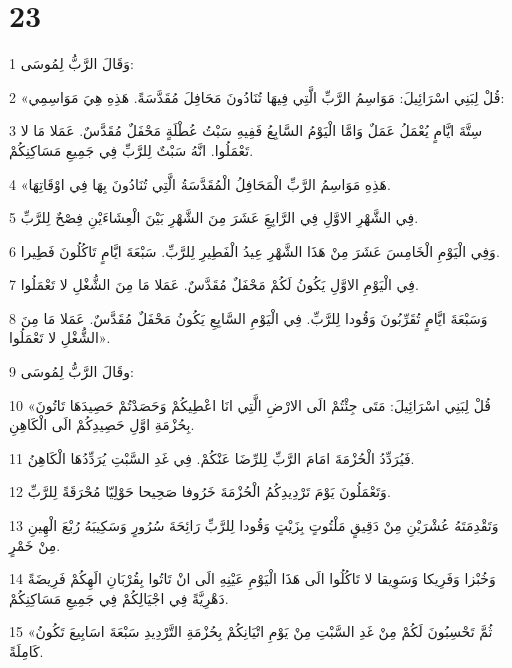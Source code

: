 \chapter{23}

\par 1 وَقَالَ الرَّبُّ لِمُوسَى:
\par 2 «قُلْ لِبَنِي اسْرَائِيلَ: مَوَاسِمُ الرَّبِّ الَّتِي فِيهَا تُنَادُونَ مَحَافِلَ مُقَدَّسَةً. هَذِهِ هِيَ مَوَاسِمِي:
\par 3 سِتَّةَ ايَّامٍ يُعْمَلُ عَمَلٌ وَامَّا الْيَوْمُ السَّابِعُ فَفِيهِ سَبْتُ عُطْلَةٍ مَحْفَلٌ مُقَدَّسٌ. عَمَلا مَا لا تَعْمَلُوا. انَّهُ سَبْتٌ لِلرَّبِّ فِي جَمِيعِ مَسَاكِنِكُمْ.
\par 4 «هَذِهِ مَوَاسِمُ الرَّبِّ الْمَحَافِلُ الْمُقَدَّسَةُ الَّتِي تُنَادُونَ بِهَا فِي اوْقَاتِهَا.
\par 5 فِي الشَّهْرِ الاوَّلِ فِي الرَّابِعَِ عَشَرَ مِنَ الشَّهْرِ بَيْنَ الْعِشَاءَيْنِ فِصْحٌ لِلرَّبِّ.
\par 6 وَفِي الْيَوْمِ الْخَامِسَ عَشَرَ مِنْ هَذَا الشَّهْرِ عِيدُ الْفَطِيرِ لِلرَّبِّ. سَبْعَةَ ايَّامٍ تَاكُلُونَ فَطِيرا.
\par 7 فِي الْيَوْمِ الاوَّلِ يَكُونُ لَكُمْ مَحْفَلٌ مُقَدَّسٌ. عَمَلا مَا مِنَ الشُّغْلِ لا تَعْمَلُوا.
\par 8 وَسَبْعَةَ ايَّامٍ تُقَرِّبُونَ وَقُودا لِلرَّبِّ. فِي الْيَوْمِ السَّابِعِ يَكُونُ مَحْفَلٌ مُقَدَّسٌ. عَمَلا مَا مِنَ الشُّغْلِ لا تَعْمَلُوا».
\par 9 وقَالَ الرَّبُّ لِمُوسَى:
\par 10 «قُلْ لِبَنِي اسْرَائِيلَ: مَتَى جِئْتُمْ الَى الارْضِ الَّتِي انَا اعْطِيكُمْ وَحَصَدْتُمْ حَصِيدَهَا تَاتُونَ بِحُزْمَةِ اوَّلِ حَصِيدِكُمْ الَى الْكَاهِنِ.
\par 11 فَيُرَدِّدُ الْحُزْمَةَ امَامَ الرَّبِّ لِلرِّضَا عَنْكُمْ. فِي غَدِ السَّبْتِ يُرَدِّدُهَا الْكَاهِنُ.
\par 12 وَتَعْمَلُونَ يَوْمَ تَرْدِيدِكُمُ الْحُزْمَةَ خَرُوفا صَحِيحا حَوْلِيّا مُحْرَقَةً لِلرَّبِّ.
\par 13 وَتَقْدِمَتَهُ عُشْرَيْنِ مِنْ دَقِيقٍ مَلْتُوتٍ بِزَيْتٍ وَقُودا لِلرَّبِّ رَائِحَةَ سُرُورٍ وَسَكِيبَهُ رُبْعَ الْهِينِ مِنْ خَمْرٍ.
\par 14 وَخُبْزا وَفَرِيكا وَسَوِيقا لا تَاكُلُوا الَى هَذَا الْيَوْمِ عَيْنِهِ الَى انْ تَاتُوا بِقُرْبَانِ الَهِكُمْ فَرِيضَةً دَهْرِيَّةً فِي اجْيَالِكُمْ فِي جَمِيعِ مَسَاكِنِكُمْ.
\par 15 «ثُمَّ تَحْسِبُونَ لَكُمْ مِنْ غَدِ السَّبْتِ مِنْ يَوْمِ اتْيَانِكُمْ بِحُزْمَةِ التَّرْدِيدِ سَبْعَةَ اسَابِيعَ تَكُونُ كَامِلَةً.

